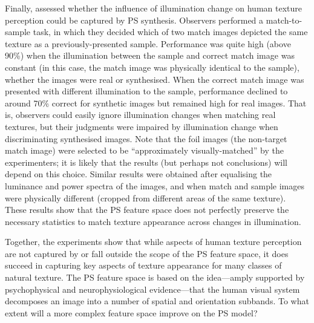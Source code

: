 \documentclass[article, 11pt,a4paper,natbib]{apa6}\usepackage[]{graphicx}\usepackage[]{color}
\begin{document}
Finally, \citet{balas_invariant_2015} assessed whether the influence of illumination change on human texture perception could be captured by PS synthesis.
Observers performed a match-to-sample task, in which they decided which of two match images depicted the same texture as a previously-presented sample.
Performance was quite high (above 90\%) when the illumination between the sample and correct match image was constant (in this case, the match image was physically identical to the sample), whether the images were real or synthesised.
When the correct match image was presented with different illumination to the sample, performance declined to around 70\% correct for synthetic images but remained high for real images.
That is, observers could easily ignore illumination changes when matching real textures, but their judgments were impaired by illumination change when discriminating synthesised images.
Note that the foil images (the non-target match image) were selected to be ``approximately visually-matched'' by the experimenters; it is likely that the results (but perhaps not conclusions) will depend on this choice.
Similar results were obtained after equalising the luminance and power spectra of the images, and when match and sample images were physically different (cropped from different areas of the same texture). 
These results show that the PS feature space does not perfectly preserve the necessary statistics to match texture appearance across changes in illumination.

Together, the experiments show that while aspects of human texture perception are not captured by or fall outside the scope of the PS feature space, it does succeed in capturing key aspects of texture appearance for many classes of natural texture. 
The PS feature space is based on the idea---amply supported by psychophysical and neurophysiological evidence---that the human visual system decomposes an image into a number of spatial and orientation subbands.
To what extent will a more complex feature space improve on the PS model?
\end{document}
